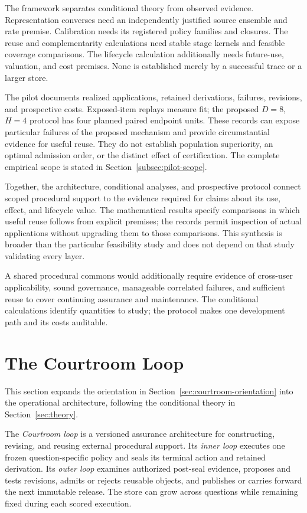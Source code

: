 \documentclass[10pt]{article} %
\providecommand{\1}{\mathbf{1}}  %
\theoremstyle{remark}
\theoremstyle{definition}
\begin{document}
The framework separates conditional theory from observed evidence.
Representation converses need an independently justified source ensemble
and rate premise. Calibration needs its registered policy families and
closures. The reuse and complementarity calculations need stable stage
kernels and feasible coverage comparisons. The lifecycle calculation
additionally needs future-use, valuation, and cost premises. None is
established merely by a successful trace or a larger store.

The pilot documents realized applications, retained derivations,
failures, revisions, and prospective costs. Exposed-item replays measure
fit; the proposed $D=8$, $H=4$ protocol has four planned paired endpoint
units. These records can expose particular failures of the proposed mechanism and
provide circumstantial evidence for useful reuse. They do not establish
population superiority, an optimal admission order, or the distinct
effect of certification. The complete empirical scope is stated in
Section~\ref{subsec:pilot-scope}.

Together, the architecture, conditional analyses, and prospective protocol
connect scoped procedural support to the evidence required for claims about
its use, effect, and lifecycle value. The mathematical results specify
comparisons in which useful reuse follows from explicit premises; the
records permit inspection of actual applications without upgrading them
to those comparisons. This synthesis is broader than the particular
feasibility study and does not depend on that study validating every layer.

A shared procedural commons would additionally require evidence of
cross-user applicability, sound governance, manageable correlated
failures, and sufficient reuse to cover continuing assurance and
maintenance. The conditional calculations identify quantities to study;
the protocol makes one development path and its costs auditable.
\FloatBarrier

\section{The Courtroom Loop}
\label{sec:the-courtroom-loop}

This section expands the orientation in
Section~\ref{sec:courtroom-orientation} into the operational architecture,
following the conditional theory in Section~\ref{sec:theory}.

The \emph{Courtroom loop} is a versioned assurance architecture for
constructing, revising, and reusing external procedural support. Its
\emph{inner loop} executes one frozen question-specific policy and seals
its terminal action and retained derivation. Its \emph{outer loop}
examines authorized post-seal evidence, proposes and tests revisions,
admits or rejects reusable objects, and publishes or carries forward the
next immutable release. The store can grow across questions while
remaining fixed during each scored execution.
\end{document}

